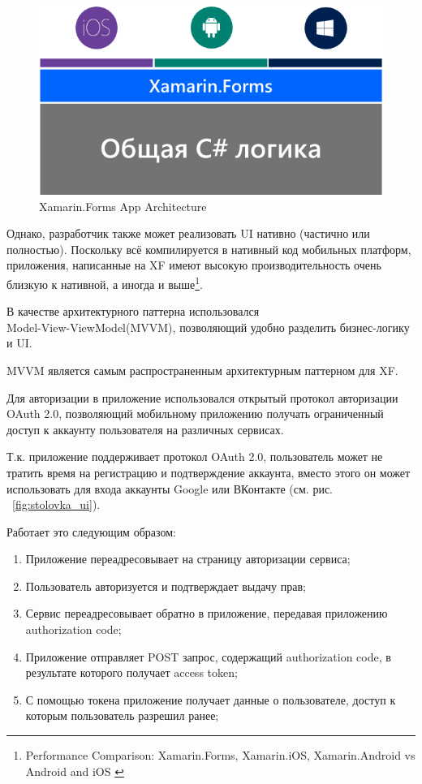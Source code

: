 \documentclass[14pt]{matmex-diploma-custom}
\begin{document}
	    \begin{figure}[h!]
	        \centering
	        \includegraphics[scale=0.7]{images/xamarin_forms_framework}
	        \caption{Xamarin.Forms App Architecture}
	        \label{fig:xf_app_arch}
	    \end{figure}

	    Однако, разработчик также может реализовать UI нативно (частично или полностью).
	    Поскольку всё компилируется в нативный код мобильных платформ, приложения, написанные на XF
	    имеют высокую производительность очень близкую к нативной, а иногда и выше\footnote{Performance Comparison: Xamarin.Forms, Xamarin.iOS, Xamarin.Android vs Android and iOS \cite{xamarin_perf_vs_native}}.

	    В качестве архитектурного паттерна использовался \\ Model-View-ViewModel(MVVM)\cite{MVVM_wiki},
	    позволяющий удобно разделить бизнес-логику и UI.

	    MVVM является самым распространенным архитектурным паттерном для XF.

	    Для авторизации в приложение использовался открытый протокол авторизации OAuth 2.0, позволяющий мобильному приложению получать ограниченный доступ к аккаунту пользователя на различных сервисах.

	    Т.к. приложение поддерживает протокол OAuth 2.0, пользователь может не тратить время на регистрацию и подтверждение аккаунта, вместо этого он может использовать для входа аккаунты Google или ВКонтакте (см. рис. ~\ref{fig:stolovka_ui}).

	    Работает это следующим образом:
	    \begin{enumerate}
	        \item Приложение переадресовывает на страницу авторизации сервиса;
	        \item Пользователь авторизуется и подтверждает выдачу прав;
	        \item Сервис переадресовывает обратно в приложение, передавая приложению authorization code;
	        \item Приложение отправляет POST запрос, содержащий authorization code, в результате которого получает access token;
	        \item С помощью токена приложение получает данные о пользователе, доступ к которым пользователь разрешил ранее;
	    \end{enumerate}
\end{document}

